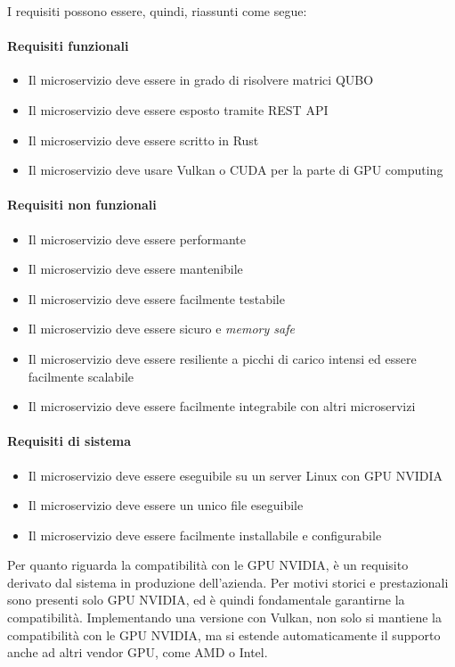 I requisiti possono essere, quindi, riassunti come segue:

\paragraph{Requisiti funzionali}
\begin{itemize}
    \item Il microservizio deve essere in grado di risolvere matrici \gls{QUBO}
    \item Il microservizio deve essere esposto tramite REST \gls{API}
    \item Il microservizio deve essere scritto in Rust
    \item Il microservizio deve usare Vulkan o \gls{CUDA} per la parte di \gls{GPU} computing
\end{itemize}

\paragraph{Requisiti non funzionali}
\begin{itemize}
    \item Il microservizio deve essere performante
    \item Il microservizio deve essere mantenibile
    \item Il microservizio deve essere facilmente testabile
    \item Il microservizio deve essere sicuro e \textit{memory safe}
    \item Il microservizio deve essere resiliente a picchi di carico intensi ed essere facilmente scalabile
    \item Il microservizio deve essere facilmente integrabile con altri microservizi
\end{itemize}

\paragraph{Requisiti di sistema}
\begin{itemize}
    \item Il microservizio deve essere eseguibile su un server Linux con \gls{GPU} NVIDIA
    \item Il microservizio deve essere un unico file eseguibile
    \item Il microservizio deve essere facilmente installabile e configurabile
\end{itemize}

Per quanto riguarda la compatibilità con le \gls{GPU} NVIDIA, è un requisito derivato dal sistema in produzione dell'azienda. Per motivi storici e prestazionali sono presenti solo \gls{GPU} NVIDIA, ed è quindi fondamentale garantirne la compatibilità. Implementando una versione con Vulkan, non solo si mantiene la compatibilità con le \gls{GPU} NVIDIA, ma si estende automaticamente il supporto anche ad altri vendor \gls{GPU}, come AMD o Intel.

